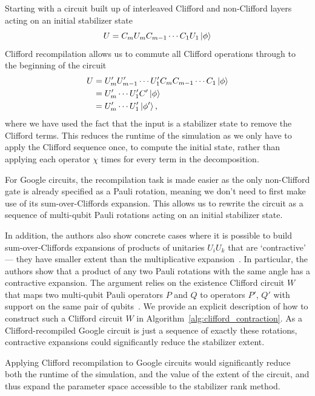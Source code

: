Starting with a circuit built up of interleaved Clifford and non-Clifford layers acting on an initial stabilizer state
\[U = C_{m}U_{m}C_{m-1}\cdots C_{1}U_{1}\ket{\phi}\]
Clifford recompilation allows us to commute all Clifford operations through to the beginning of the circuit
\begin{align*}
U &= U_{m}'U_{m-1}'\cdots U_{1}' C_{m}C_{m-1}\cdots C_{1}\ket{\phi} \\
  &= U_{m}'\cdots U_{1}' C'\ket{\phi}\\
  &= U_{m}'\cdots U_{1}'\ket{\phi'},
\end{align*}
where we have used the fact that the input is a stabilizer state to remove the Clifford terms.
This reduces the runtime of the simulation as we only have to apply the Clifford sequence once, to compute the initial state, rather than applying each operator $\chi$ times for every term in the decomposition.\par
For Google circuits, the recompilation task is made easier as the only non-Clifford gate is already specified as a Pauli rotation, meaning we don't need to first make use of its sum-over-Cliffords expansion. This allows us to rewrite the circuit as a sequence of multi-qubit Pauli rotations acting on an initial stabilizer state.\par
In addition, the authors also show concrete cases where it is possible to build sum-over-Cliffords expansions of products of unitaries $U_{i}U_{k}$ that are `contractive' --- they have smaller extent than the multiplicative expansion~\cite{Qassim2019}. In particular, the authors show that a product of any two Pauli rotations with the same angle has a contractive expansion. The argument relies on the existence Clifford circuit $W$ that maps two multi-qubit Pauli operators $P$ and $Q$ to operators $P'$, $Q'$ with support on the same pair of qubits~\cite{Qassim2019}. We provide an explicit description of how to construct such a Clifford circuit $W$ in Algorithm~\ref{alg:clifford_contraction}. As a Clifford-recompiled Google circuit is just a sequence of exactly these rotations, contractive expansions could significantly reduce the stabilizer extent.\par
Applying Clifford recompilation to Google circuits would significantly reduce both the runtime of the simulation, and the value of the extent of the circuit, and thus expand the parameter space accessible to the stabilizer rank method.
